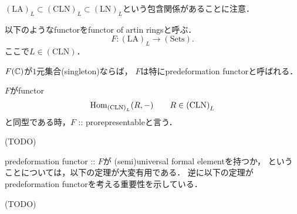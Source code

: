 \documentclass[a4paper]{jsarticle}
\newcommand{\LA}{\mathrm{(LA)}}
\newcommand{\LN}{\mathrm{(LN)}}
\newcommand{\CLN}{\mathrm{(CLN)}}
\begin{document}
    $\LA_L \subset \CLN_L \subset \LN_L$という包含関係があることに注意．

    \begin{Def}
        以下のようなfunctorをfunctor of artin ringsと呼ぶ．
        \[ F: \LA_L \to \mathrm{(Sets)}. \]
        ここで$L \in \CLN$．

        $F(\mathbb{C})$が$1$元集合(singleton)ならば，
        $F$は特にpredeformation functorと呼ばれる．

        $F$がfunctor
        \[ \Hom_{\CLN_L}(R, -) \qquad R \in \CLN_L \]
        と同型である時，$F$ :: prorepresentableと言う．
    \end{Def}

    \begin{Def}
        (TODO)
    \end{Def}

    predeformation functor :: $F$が
    (semi)universal formal elementを持つか，
    ということについては，以下の定理が大変有用である．
    逆に以下の定理がpredeformation functorを考える重要性を示している．

    \begin{Thm}
        (TODO)
    \end{Thm}



\end{document}
